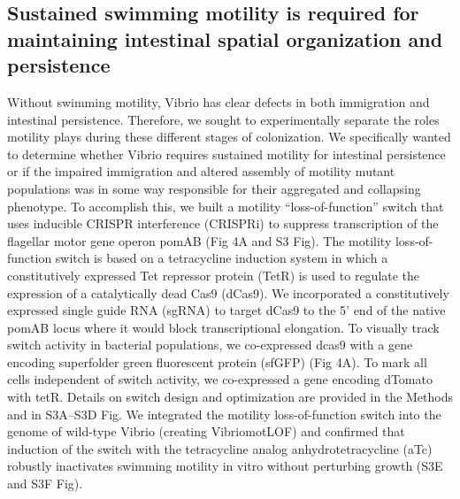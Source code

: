 \subsection{Sustained swimming motility is required for maintaining intestinal spatial organization and persistence}  
Without swimming motility, Vibrio has clear defects in both immigration and intestinal persistence. Therefore, we sought to experimentally separate the roles motility plays during these different stages of colonization. We specifically wanted to determine whether Vibrio requires sustained motility for intestinal persistence or if the impaired immigration and altered assembly of motility mutant populations was in some way responsible for their aggregated and collapsing phenotype. To accomplish this, we built a motility ``loss-of-function'' switch that uses inducible CRISPR interference (CRISPRi) to suppress transcription of the flagellar motor gene operon pomAB (Fig 4A and S3 Fig). The motility loss-of-function switch is based on a tetracycline induction system in which a constitutively expressed Tet repressor protein (TetR) is used to regulate the expression of a catalytically dead Cas9 (dCas9). We incorporated a constitutively expressed single guide RNA (sgRNA) to target dCas9 to the 5' end of the native pomAB locus where it would block transcriptional elongation. To visually track switch activity in bacterial populations, we co-expressed dcas9 with a gene encoding superfolder green fluorescent protein (sfGFP) (Fig 4A). To mark all cells independent of switch activity, we co-expressed a gene encoding dTomato with tetR. Details on switch design and optimization are provided in the Methods and in S3A–S3D Fig. We integrated the motility loss-of-function switch into the genome of wild-type Vibrio (creating VibriomotLOF) and confirmed that induction of the switch with the tetracycline analog anhydrotetracycline (aTc) robustly inactivates swimming motility in vitro without perturbing growth (S3E and S3F Fig).  

